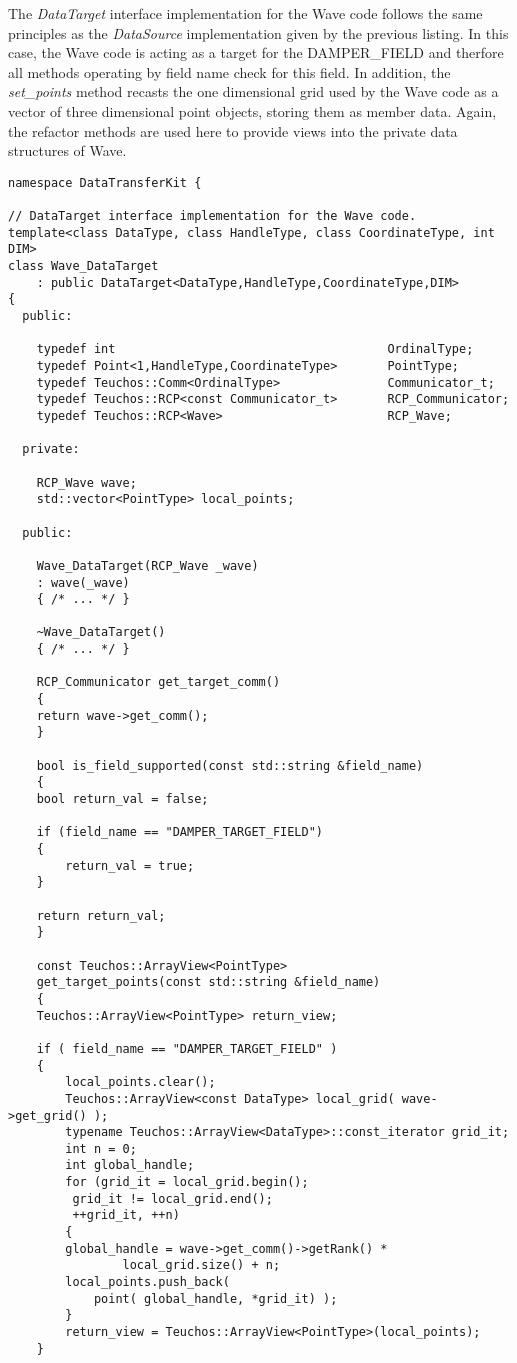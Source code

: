 \documentclass[letterpaper]{article}
\begin{document}
The {\sl DataTarget} interface implementation for the Wave code
follows the same principles as the {\sl DataSource} implementation
given by the previous listing. In this case, the Wave code is acting
as a target for the DAMPER\_FIELD and therfore all methods operating
by field name check for this field. In addition, the {\sl set\_points}
method recasts the one dimensional grid used by the Wave code as a
vector of three dimensional point objects, storing them as member
data. Again, the refactor methods are used here to provide views into
the private data structures of Wave.

\begin{lstlisting}
namespace DataTransferKit {

// DataTarget interface implementation for the Wave code.
template<class DataType, class HandleType, class CoordinateType, int DIM>
class Wave_DataTarget 
    : public DataTarget<DataType,HandleType,CoordinateType,DIM>
{
  public:

    typedef int                                      OrdinalType;
    typedef Point<1,HandleType,CoordinateType>       PointType;
    typedef Teuchos::Comm<OrdinalType>               Communicator_t;
    typedef Teuchos::RCP<const Communicator_t>       RCP_Communicator;
    typedef Teuchos::RCP<Wave>                       RCP_Wave;

  private:

    RCP_Wave wave;
    std::vector<PointType> local_points;

  public:

    Wave_DataTarget(RCP_Wave _wave)
	: wave(_wave)
    { /* ... */ }

    ~Wave_DataTarget()
    { /* ... */ }

    RCP_Communicator get_target_comm()
    {
	return wave->get_comm();
    }

    bool is_field_supported(const std::string &field_name)
    {
	bool return_val = false;

	if (field_name == "DAMPER_TARGET_FIELD")
	{
	    return_val = true;
	}

	return return_val;
    }

    const Teuchos::ArrayView<PointType> 
    get_target_points(const std::string &field_name)
    {
	Teuchos::ArrayView<PointType> return_view;

	if ( field_name == "DAMPER_TARGET_FIELD" )
	{
	    local_points.clear();
	    Teuchos::ArrayView<const DataType> local_grid( wave->get_grid() );
	    typename Teuchos::ArrayView<DataType>::const_iterator grid_it;
	    int n = 0;
	    int global_handle;
	    for (grid_it = local_grid.begin(); 
		 grid_it != local_grid.end();
		 ++grid_it, ++n)
	    {
		global_handle = wave->get_comm()->getRank() *
				local_grid.size() + n;
		local_points.push_back( 
		    point( global_handle, *grid_it) );
	    }
	    return_view = Teuchos::ArrayView<PointType>(local_points);
	}


\end{lstlisting}
\end{document}
